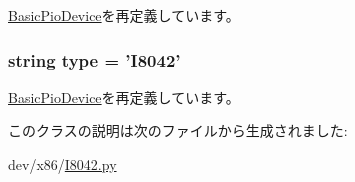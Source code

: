 \hyperlink{classDevice_1_1BasicPioDevice_aac8239d62c5a04a05fcc71d4ac63fdb4}{BasicPioDevice}を再定義しています。\hypertarget{classI8042_1_1I8042_acce15679d830831b0bbe8ebc2a60b2ca}{
\subsubsection[{type}]{\setlength{\rightskip}{0pt plus 5cm}string {\bf type} = '{\bf I8042}'}}
\label{classI8042_1_1I8042_acce15679d830831b0bbe8ebc2a60b2ca}


\hyperlink{classDevice_1_1BasicPioDevice_acce15679d830831b0bbe8ebc2a60b2ca}{BasicPioDevice}を再定義しています。

このクラスの説明は次のファイルから生成されました:\begin{DoxyCompactItemize}
\item 
dev/x86/\hyperlink{I8042_8py}{I8042.py}\end{DoxyCompactItemize}
